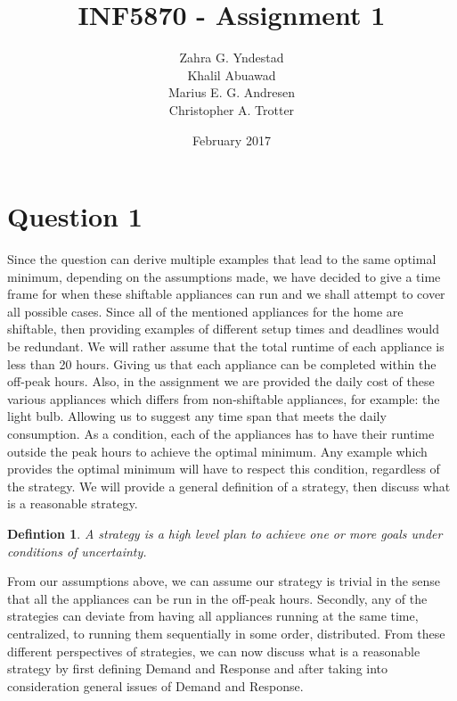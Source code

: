 \documentclass[
11pt, %
english, %
singlespacing, %
parskip, %
headsepline, %
]{report} %
\title{INF5870 - Assignment 1}
\author{Zahra G. Yndestad \\ Khalil Abuawad \\ Marius E. G. Andresen \\ Christopher A. Trotter}
\date{February 2017}
\newtheorem{definition}[theorem]{Defintion}
\begin{document}


\frontmatter %

\tableofcontents %

\pagestyle{plain} %

\newpage

\section{Question 1}
	Since the question can derive multiple examples that lead to the same optimal minimum, depending on the assumptions made, we have decided to give a time frame for when these shiftable appliances can run and we shall attempt to cover all possible cases. Since all of the mentioned appliances for the home are shiftable, then providing examples of different setup times and deadlines would be redundant. We will rather assume that the total runtime of each appliance is less than 20 hours. Giving us that each appliance can be completed within the off-peak hours. Also, in the assignment we are provided the daily cost of these various appliances which differs from non-shiftable appliances, for example: the light bulb. Allowing us to suggest any time span that meets the daily consumption.  As a condition, each of the appliances has to have their runtime outside the peak hours to achieve the optimal minimum. Any example which provides the optimal minimum will have to respect this condition, regardless of the strategy. We will provide a general definition of a strategy, then discuss what is a reasonable strategy.

	\begin{definition}
    	A strategy is a high level plan to achieve one or more goals under conditions of uncertainty{\cite{wikistrategy}}.
	\end{definition}

	From our assumptions above, we can assume our strategy is trivial in the sense that all the appliances can be run in the off-peak hours. Secondly, any of the strategies can deviate from having all appliances running at the same time, centralized, to running them sequentially in some order, distributed. From these different perspectives of strategies, we can now discuss what is a reasonable strategy by first defining Demand and Response and after taking into consideration general issues of Demand and Response.
\end{document}
